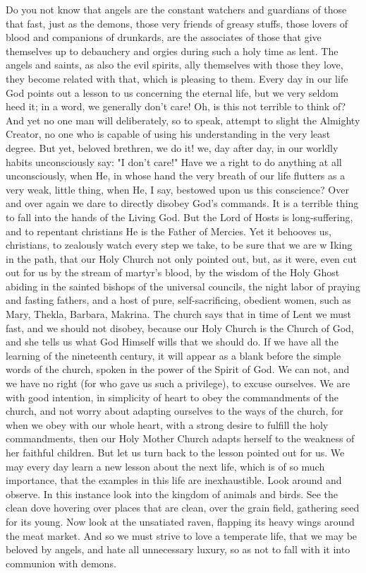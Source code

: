 Do you not know that angels are the constant 
watchers and guardians of those that fast, just 
as the demons, those very friends of greasy 
stuffs, those lovers of blood and companions of 
drunkards, are the associates of those that give 
themselves up to debauchery and orgies during 
such a holy time as lent. The angels and saints, 
as also the evil spirits, ally themselves with 
those they love, they become related with that, 
which is pleasing to them. Every day in our 
life God points out a lesson to us concerning 
the eternal life, but we very seldom heed it; 
in a word, we generally don't care! Oh, is this 
not terrible to think of? And yet no one man 
will deliberately, so to speak, attempt to slight 
the Almighty Creator, no one who is capable of 
using his understanding in the very least degree.
But yet, beloved brethren, we do it! 
we, day after day, in our worldly habits unconsciously
say: "I don't care!" Have we a right 
to do anything at all unconsciously, when He, 
in whose hand the very breath of our life 
flutters as a very weak, little thing, when He, 
I say, bestowed upon us this conscience? Over 
and over again we dare to directly disobey 
God's commands. It is a terrible thing to fall 
into the hands of the Living God. But the 
Lord of Hosts is long-suffering, and to repentant
christians He is the Father of Mercies. 
Yet it behooves us, christians, to zealously 
watch every step we take, to be sure that we are 
w Iking in the path, that our Holy Church not 
only pointed out, but, as it were, even cut out 
for us by the stream of martyr's blood, by the 
wisdom of the Holy Ghost abiding in the 
sainted bishops of the universal councils, the 
night labor of praying and fasting fathers, and 
a host of pure, self-sacrificing, obedient women, 
such as Mary, Thekla, Barbara, Makrina. The 
church says that in time of Lent we must fast,
and we should not disobey, because our Holy 
Church is the Church of God, and she tells us 
what God Himself wills that we should do. If 
we have all the learning of the nineteenth century,
it will appear as a blank before the simple 
words of the church, spoken in the power of the 
Spirit of God. We can not, and we have no 
right (for who gave us such a privilege), to 
excuse ourselves. We are with good intention,
in simplicity of heart to obey the commandments
of the church, and not worry about 
adapting ourselves to the ways of the church, 
for when we obey with our whole heart, with a 
strong desire to fulfill the holy commandments,
then our Holy Mother Church adapts 
herself to the weakness of her faithful children. 
But let us turn back to the lesson pointed out 
for us. We may every day learn a new lesson 
about the next life, which is of so much importance,
that the examples in this life are inexhaustible.
Look around and observe. In this 
instance look into the kingdom of animals and 
birds. See the clean dove hovering over places 
that are clean, over the grain field, gathering 
seed for its young. Now look at the unsatiated 
raven, flapping its heavy wings around the meat 
market. And so we must strive to love a
temperate life, that we may be beloved by 
angels, and hate all unnecessary luxury, so as 
not to fall with it into communion with demons.


